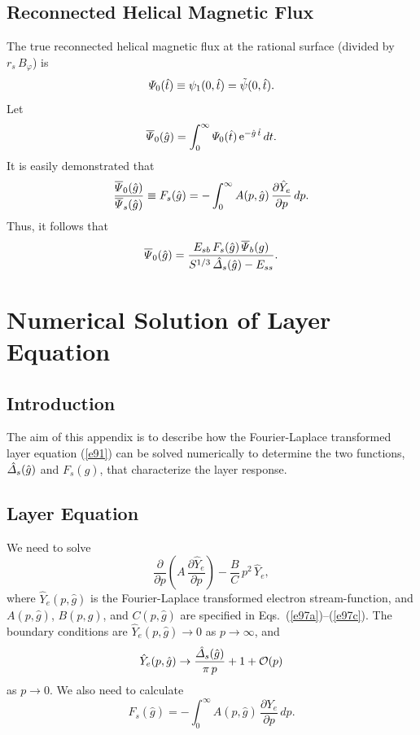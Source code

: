 \documentclass[12pt,prb,aps]{revtex4-1}
\begin{document}
\subsection{Reconnected Helical Magnetic Flux}\label{recon}
The true reconnected helical magnetic flux at the rational surface (divided by $r_s\,B_\varphi$)  is
\begin{equation}
{\mit\Psi}_0(\hat{t}) \equiv \psi_1(0,\hat{t}) = \tilde{\psi}(0,\hat{t}).
\end{equation}
Let 
\begin{equation}
\overline{\mit\Psi}_0(\hat{g}) = \int_0^\infty {\mit\Psi}_0(\hat{t})\,{\rm e}^{-\hat{g}\,\hat{t}}\,dt.
\end{equation}
It is easily demonstrated  that\,\cite{rf1}
\begin{equation}\label{e103}
\frac{\overline{\mit\Psi}_0(\hat{g})}{\overline{\mit\Psi}_s(\hat{g})}\equiv F_s(\hat{g}) = -\int_0^\infty A(p,\hat{g})\,\frac{\partial \hat{Y}_e}{\partial p}\,dp.
\end{equation}
Thus, it follows that
\begin{equation}\label{e110}
\overline{\mit\Psi}_0(\hat{g}) =\frac{ E_{sb}\,F_s(\hat{g})\,\overline{\mit\Psi}_b(g)}{S^{1/3}\,\hat{\mit\Delta}_s(\hat{g})-E_{ss}}.
\end{equation}

\section{Numerical Solution of Layer Equation}\label{appd}

\subsection{Introduction}
The aim of this appendix is to describe how the Fourier-Laplace transformed layer equation (\ref{e91}) can be solved numerically to
determine the two functions, $\hat{\mit\Delta}_s(\hat{g})$ and $F_s(\hat{g})$, that characterize the layer response. 

\subsection{Layer Equation}
We need to solve
\begin{equation}\label{e83}
\frac{\partial}{\partial p}\!\left(A\,\frac{\partial\hat{Y}_e}{\partial p}\right) - \frac{B}{C}\,p^2\,\hat{Y}_e,
\end{equation}
where $\hat{Y}_e(p,\hat{g})$ is the Fourier-Laplace transformed electron stream-function, and $A(p,\hat{g})$, $B(p,\hat{g})$,
and $C(p,\hat{g})$ are specified in Eqs.~(\ref{e97a})--(\ref{e97c}). 
The boundary conditions are $\hat{Y}_e(p,\hat{g})\rightarrow 0$ as $p\rightarrow\infty$, and
\begin{equation}\label{esmall}
\hat{Y}_e(p,\hat{g})\rightarrow  \frac{\hat{\mit\Delta}_s(\hat{g})}{\pi\,p}+ 1+{\cal O}(p)
\end{equation}
as $p\rightarrow 0$. We also need to calculate
\begin{equation}
F_s(\hat{g}) = -\int_0^\infty A(p,\hat{g})\,\frac{\partial Y_e}{\partial p}\,dp.
\end{equation}
\end{document}
